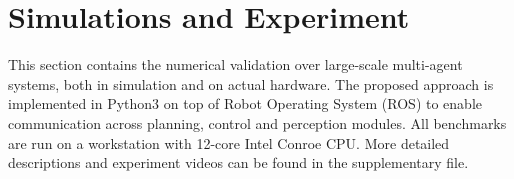 \section{Simulations and Experiment}\label{sec:experiments}

This section contains the numerical validation over large-scale multi-agent systems, both in simulation and on actual hardware.
The proposed approach is implemented in Python3 on top of Robot Operating System (ROS) to enable communication across planning, control and perception modules.
All benchmarks are run on a workstation with 12-core Intel Conroe CPU.
More detailed descriptions and experiment videos can be found in the supplementary file.




